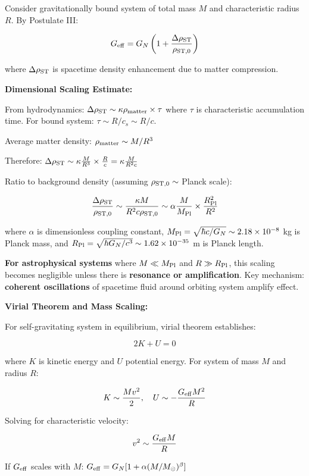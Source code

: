 \documentclass[10pt,a4paper]{article}
\begin{document}
Consider gravitationally bound system of total mass \(M\) and
characteristic radius \(R\). By Postulate III:

\[G_{\rm eff} = G_N \left(1 + \frac{\Delta \rho_{\rm ST}}{\rho_{\rm ST,0}}\right)\]

where \(\Delta \rho_{\rm ST}\) is spacetime density enhancement due to
matter compression.

\textbf{Dimensional Scaling Estimate:}

From hydrodynamics:
\(\Delta \rho_{\rm ST} \sim \kappa \rho_{\rm matter} \times \tau\) where
\(\tau\) is characteristic accumulation time. For bound system:
\(\tau \sim R/c_s \sim R/c\).

Average matter density: \(\rho_{\rm matter} \sim M/R^3\)

Therefore:
\(\Delta \rho_{\rm ST} \sim \kappa \frac{M}{R^3} \times \frac{R}{c} = \kappa \frac{M}{R^2 c}\)

Ratio to background density (assuming \(\rho_{\rm ST,0} \sim\) Planck
scale):

\[\frac{\Delta \rho_{\rm ST}}{\rho_{\rm ST,0}} \sim \frac{\kappa M}{R^2 c \rho_{\rm ST,0}} \sim \alpha \frac{M}{M_{\rm Pl}} \times \frac{R_{\rm Pl}^2}{R^2}\]

where \(\alpha\) is dimensionless coupling constant,
\(M_{\rm Pl} = \sqrt{\hbar c/G_N} \sim 2.18 \times 10^{-8}\) kg is
Planck mass, and
\(R_{\rm Pl} = \sqrt{\hbar G_N/c^3} \sim 1.62 \times 10^{-35}\) m is
Planck length.

\textbf{For astrophysical systems} where \(M \ll M_{\rm Pl}\) and
\(R \gg R_{\rm Pl}\), this scaling becomes negligible unless there is
\textbf{resonance or amplification}. Key mechanism: \textbf{coherent
oscillations} of spacetime fluid around orbiting system amplify effect.

\textbf{Virial Theorem and Mass Scaling:}

For self-gravitating system in equilibrium, virial theorem establishes:

\[2 K + U = 0\]

where \(K\) is kinetic energy and \(U\) potential energy. For system of
mass \(M\) and radius \(R\):

\[K \sim \frac{M v^2}{2}, \quad U \sim -\frac{G_{\rm eff} M^2}{R}\]

Solving for characteristic velocity:

\[v^2 \sim \frac{G_{\rm eff} M}{R}\]

If \(G_{\rm eff}\) scales with \(M\):
\(G_{\rm eff} = G_N[1 + \alpha (M/M_\odot)^\beta]\)
\end{document}
